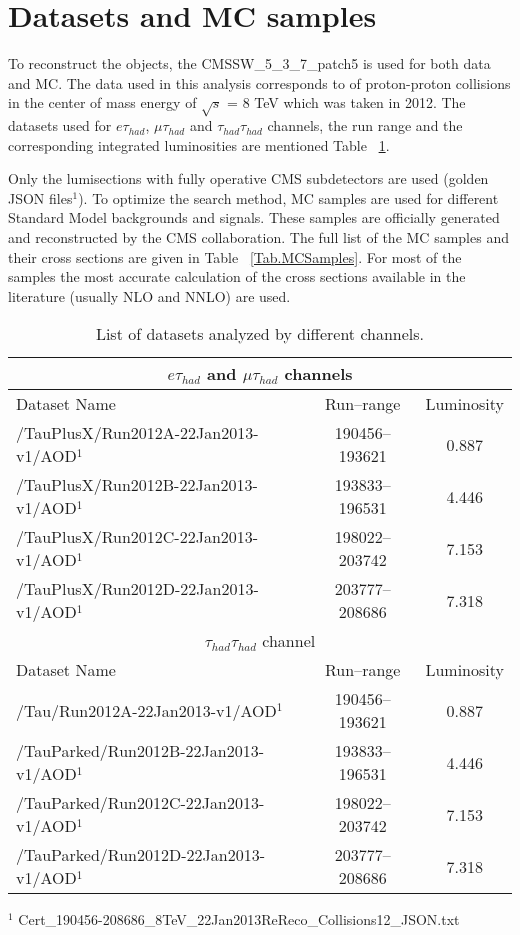 \section{Datasets and MC samples}
\label{sect:dataMC}
To reconstruct the objects, the CMSSW\_5\_3\_7\_patch5 is used for both data and MC.
The data used in this analysis corresponds to \IL of proton-proton collisions in the center of mass energy of $\sqrt{s}$ = 8 TeV 
which was taken in 2012. The datasets used for $e\tau_{had}$, $\mu\tau_{had}$ and $\tau_{had}\tau_{had}$ channels, the run range and the corresponding integrated luminosities are mentioned Table ~\ref{Tab.DataSamples}.

Only the lumisections with fully operative CMS subdetectors are used (golden JSON files$^{1}$). To optimize the search method, MC 
samples are used for different Standard Model backgrounds and signals. These samples are officially generated and reconstructed by the CMS
collaboration. The full list of the MC samples and their cross sections are given in Table ~\ref{Tab.MCSamples}. For most of the samples the most 
accurate calculation of the cross sections available in the literature (usually NLO and NNLO) are used. 



\begin{table}[!h]

\begin{center}
\small{
\begin{tabular}{|l|c|c|}
\hline
\multicolumn{3}{|c|}{$e\tau_{had}$ and $\mu\tau_{had}$ channels} \\
\hline
Dataset Name & Run--range & Luminosity \\
\hline
/TauPlusX/Run2012A-22Jan2013-v1/AOD$^{1}$   & 190456--193621 & 0.887\\
/TauPlusX/Run2012B-22Jan2013-v1/AOD$^{1}$   & 193833--196531 & 4.446\\
/TauPlusX/Run2012C-22Jan2013-v1/AOD$^{1}$   & 198022--203742 & 7.153\\
/TauPlusX/Run2012D-22Jan2013-v1/AOD$^{1}$   & 203777--208686 & 7.318\\
\hline
\hline
\multicolumn{3}{|c|}{$\tau_{had}\tau_{had}$ channel} \\
\hline
Dataset Name & Run--range & Luminosity \\
\hline
/Tau/Run2012A-22Jan2013-v1/AOD$^{1}$   & 190456--193621 & 0.887 \\
/TauParked/Run2012B-22Jan2013-v1/AOD$^{1}$ & 193833--196531 & 4.446 \\
/TauParked/Run2012C-22Jan2013-v1/AOD$^{1}$ & 198022--203742 & 7.153 \\
/TauParked/Run2012D-22Jan2013-v1/AOD$^{1}$ & 203777--208686 & 7.318 \\
\hline

\end{tabular}
}
\end{center}
$^{1}$ Cert\_190456-208686\_8TeV\_22Jan2013ReReco\_Collisions12\_JSON.txt \\
\caption{
  List of datasets analyzed by different channels.
}
\label{Tab.DataSamples}
\end{table}





